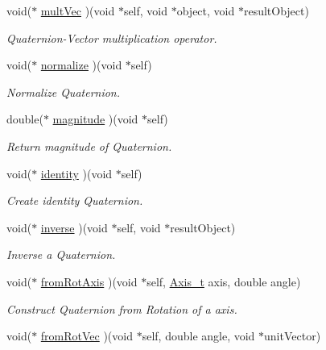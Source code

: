 \begin{CompactItemize}
void($\ast$ \hyperlink{structdrdc__Orient__t_0fca278ef2257a2c645c0c1e1a46a9ac}{multVec} )(void $\ast$self, void $\ast$object, void $\ast$resultObject)
\begin{CompactList}\small\item\em Quaternion-Vector multiplication operator. \item\end{CompactList}\item 
void($\ast$ \hyperlink{structdrdc__Orient__t_ac3a732bfd83f0a8053bc47f61217426}{normalize} )(void $\ast$self)
\begin{CompactList}\small\item\em Normalize Quaternion. \item\end{CompactList}\item 
double($\ast$ \hyperlink{structdrdc__Orient__t_1ec8cc2750eb72e3b1bb299623c7ea33}{magnitude} )(void $\ast$self)
\begin{CompactList}\small\item\em Return magnitude of Quaternion. \item\end{CompactList}\item 
void($\ast$ \hyperlink{structdrdc__Orient__t_f7869b90e7daf9ef2a7393ca730ffd0e}{identity} )(void $\ast$self)
\begin{CompactList}\small\item\em Create identity Quaternion. \item\end{CompactList}\item 
void($\ast$ \hyperlink{structdrdc__Orient__t_5763d3a77beab92499ad9b34372ff0a1}{inverse} )(void $\ast$self, void $\ast$resultObject)
\begin{CompactList}\small\item\em Inverse a Quaternion. \item\end{CompactList}\item 
void($\ast$ \hyperlink{structdrdc__Orient__t_900a9fe69012056dbee9f166650e777a}{fromRotAxis} )(void $\ast$self, \hyperlink{libdrdc_8h_32b2eaf8bafc891ec8018cbe48d39243}{Axis\_\-t} axis, double angle)
\begin{CompactList}\small\item\em Construct Quaternion from Rotation of a axis. \item\end{CompactList}\item 
void($\ast$ \hyperlink{structdrdc__Orient__t_6ee726277b61039e7de0cc29099e8fe2}{fromRotVec} )(void $\ast$self, double angle, void $\ast$unitVector)

\end{CompactItemize}
